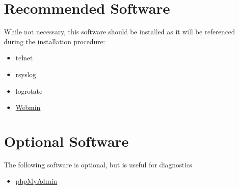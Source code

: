 \documentclass[letterpaper,10pt,english]{sphinxmanual}
\begin{document}
\section{Recommended Software}
\label{requirements:recommended-software}
While not necessary, this software should be installed as it will be referenced during the installation procedure:
\begin{itemize}
\item {} 
telnet

\item {} 
rsyslog

\item {} 
logrotate

\item {} 
\href{http://www.webmin.com/deb.html}{Webmin}

\end{itemize}


\section{Optional Software}
\label{requirements:optional-software}
The following software is optional, but is useful for diagnostics
\begin{itemize}
\item {} 
\href{http://www.phpmyadmin.net}{phpMyAdmin}

\end{itemize}
\end{document}
